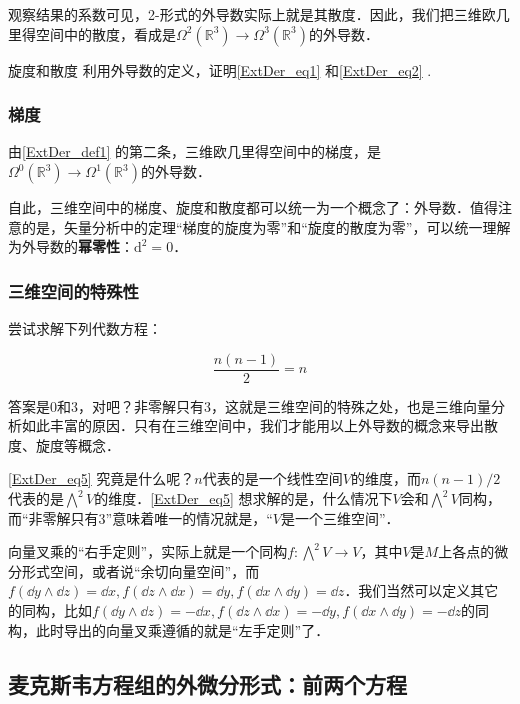 观察结果的系数可见，2-形式的外导数实际上就是其散度．因此，我们把三维欧几里得空间中的散度，看成是$\Omega^2(\mathbb{R}^3)\rightarrow\Omega^3(\mathbb{R}^3)$的外导数．

\begin{exercise}{旋度和散度}
利用外导数的定义，证明\autoref{ExtDer_eq1} 和\autoref{ExtDer_eq2} .
\end{exercise}

\subsubsection{梯度}

由\autoref{ExtDer_def1} 的第二条，三维欧几里得空间中的梯度，是$\Omega^0(\mathbb{R}^3)\rightarrow\Omega^1(\mathbb{R}^3)$的外导数．

自此，三维空间中的梯度、旋度和散度都可以统一为一个概念了：外导数．值得注意的是，矢量分析中的定理“梯度的旋度为零”和“旋度的散度为零”，可以统一理解为外导数的\textbf{幂零性}：$\mathrm{d}^2=0$．

\subsubsection{三维空间的特殊性}

尝试求解下列代数方程：

\begin{equation}\label{ExtDer_eq5}
\frac{n(n-1)}{2}=n
\end{equation}

答案是$0$和$3$，对吧？非零解只有$3$，这就是三维空间的特殊之处，也是三维向量分析如此丰富的原因．只有在三维空间中，我们才能用以上外导数的概念来导出散度、旋度等概念．

\autoref{ExtDer_eq5} 究竟是什么呢？$n$代表的是一个线性空间$V$的维度，而$n(n-1)/2$代表的是$\bigwedge^2 V$的维度．\autoref{ExtDer_eq5} 想求解的是，什么情况下$V$会和$\bigwedge^2 V$同构，而“非零解只有$3$”意味着唯一的情况就是，“$V$是一个三维空间”．

向量叉乘的“右手定则”，实际上就是一个同构$f:\bigwedge^2 V\to V$，其中$V$是$M$上各点的微分形式空间，或者说“余切向量空间”，而$f(\dd y\wedge \dd z)=\dd x, f(\dd z\wedge \dd x)=\dd y, f(\dd x\wedge \dd y)=\dd z$．我们当然可以定义其它的同构，比如$f(\dd y\wedge \dd z)=-\dd x, f(\dd z\wedge \dd x)=-\dd y, f(\dd x\wedge \dd y)=-\dd z$的同构，此时导出的向量叉乘遵循的就是“左手定则”了．



\subsection{麦克斯韦方程组的外微分形式：前两个方程}

